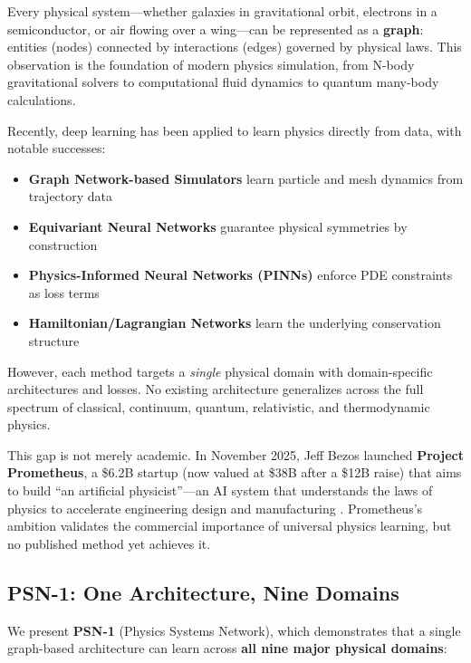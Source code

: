 \documentclass[11pt,a4paper]{article}
\begin{document}
Every physical system---whether galaxies in gravitational orbit, electrons in a semiconductor, or air flowing over a wing---can be represented as a \textbf{graph}: entities (nodes) connected by interactions (edges) governed by physical laws. This observation is the foundation of modern physics simulation, from N-body gravitational solvers to computational fluid dynamics to quantum many-body calculations.

Recently, deep learning has been applied to learn physics directly from data, with notable successes:
\begin{itemize}[leftmargin=*]
    \item \textbf{Graph Network-based Simulators} \cite{sanchez2020learning,pfaff2021learning} learn particle and mesh dynamics from trajectory data
    \item \textbf{Equivariant Neural Networks} \cite{satorras2021egnn,batzner2022nequip,batatia2022mace} guarantee physical symmetries by construction
    \item \textbf{Physics-Informed Neural Networks (PINNs)} \cite{raissi2019physics} enforce PDE constraints as loss terms
    \item \textbf{Hamiltonian/Lagrangian Networks} \cite{greydanus2019hamiltonian,cranmer2020lagrangian} learn the underlying conservation structure
\end{itemize}

However, each method targets a \emph{single} physical domain with domain-specific architectures and losses. No existing architecture generalizes across the full spectrum of classical, continuum, quantum, relativistic, and thermodynamic physics.

This gap is not merely academic. In November 2025, Jeff Bezos launched \textbf{Project Prometheus}, a \$6.2B startup (now valued at \$38B after a \$12B raise) that aims to build ``an artificial physicist''---an AI system that understands the laws of physics to accelerate engineering design and manufacturing \cite{cnbc2026prometheus,builtin2025prometheus}. Prometheus's ambition validates the commercial importance of universal physics learning, but no published method yet achieves it.

\subsection{PSN-1: One Architecture, Nine Domains}

We present \textbf{PSN-1} (Physics Systems Network), which demonstrates that a single graph-based architecture can learn across \textbf{all nine major physical domains}:
\end{document}
